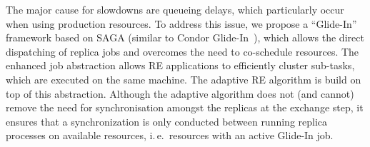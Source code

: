 \documentclass{rspublic}
\begin{document}
                 

The major cause for slowdowns are queueing delays, which particularly
occur when using production resources. To address this issue, we
propose a ``Glide-In'' framework based on SAGA (similar to Condor
Glide-In~\citep{citeulike:291860}), which allows the direct
dispatching of replica jobs and overcomes the need to co-schedule
resources.  The enhanced job abstraction allows RE applications to
efficiently cluster sub-tasks, which are executed on the same machine.
The adaptive RE algorithm is build on top of this abstraction.
Although the adaptive algorithm does not (and cannot) remove the need
for synchronisation amongst the replicas at the exchange step, it
ensures that a synchronization is only conducted between running
replica processes on available resources, i.\,e.\ resources with an
active Glide-In job.
\end{document}
